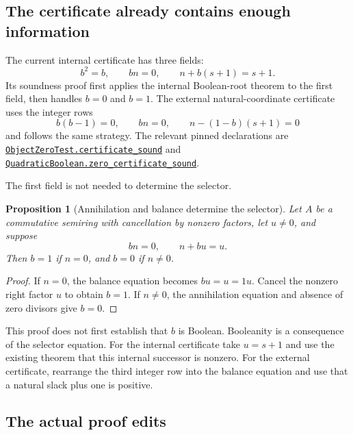 \documentclass[11pt]{article}
\newtheorem{proposition}{Proposition}
\newcommand{\code}[1]{\nolinkurl{#1}}
\begin{document}
\subsection{The certificate already contains enough information}

The current internal certificate has three fields:
\begin{equation}
 b^2=b,\qquad bn=0,\qquad n+b(s+1)=s+1.\label{eq:zerocert}
\end{equation}
Its soundness proof first applies the internal Boolean-root theorem to the
first field, then handles $b=0$ and $b=1$. The external natural-coordinate
certificate uses the integer rows
\[
 b(b-1)=0,\qquad bn=0,\qquad n-(1-b)(s+1)=0
\]
and follows the same strategy. The relevant pinned declarations are
\href{https://github.com/VladimirReshetnikov/ProveIt/blob/60fcb2a69b7f1fdd4c3592ea5f164223cad50abe/Computability/DiophantineConsistency/Lean/DiophantineConsistency/ObjectZeroTest.lean#L23-L36}{\code{ObjectZeroTest.certificate_sound}}
and
\href{https://github.com/VladimirReshetnikov/ProveIt/blob/60fcb2a69b7f1fdd4c3592ea5f164223cad50abe/Computability/DiophantineConsistency/Lean/DiophantineConsistency/QuadraticBoolean.lean#L10-L27}{\code{QuadraticBoolean.zero_certificate_sound}}.

The first field is not needed to determine the selector.

\begin{proposition}[Annihilation and balance determine the selector]
Let $A$ be a commutative semiring with cancellation by nonzero factors, let
$u\ne0$, and suppose
\[
 bn=0,\qquad n+bu=u.
\]
Then $b=1$ if $n=0$, and $b=0$ if $n\ne0$.
\end{proposition}

\begin{proof}
If $n=0$, the balance equation becomes $bu=u=1u$. Cancel the nonzero right
factor $u$ to obtain $b=1$. If $n\ne0$, the annihilation equation and absence
of zero divisors give $b=0$.
\end{proof}

This proof does not first establish that $b$ is Boolean. Booleanity is a
consequence of the selector equation. For the internal certificate take
$u=s+1$ and use the existing theorem that this internal successor is nonzero.
For the external certificate, rearrange the third integer row into the
balance equation and use that a natural slack plus one is positive.

\subsection{The actual proof edits}
\end{document}
